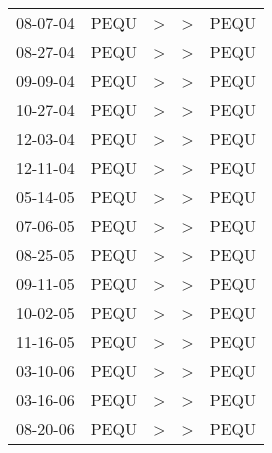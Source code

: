\begin{supertabular}{lllll}
 08-07-04 &  PEQU &  \textgreater &  \textgreater &  PEQU \\
 08-27-04 &  PEQU &  \textgreater &  \textgreater &  PEQU \\
 09-09-04 &  PEQU &  \textgreater &  \textgreater &  PEQU \\
 10-27-04 &  PEQU &  \textgreater &  \textgreater &  PEQU \\
 12-03-04 &  PEQU &  \textgreater &  \textgreater &  PEQU \\
 12-11-04 &  PEQU &  \textgreater &  \textgreater &  PEQU \\
 05-14-05 &  PEQU &  \textgreater &  \textgreater &  PEQU \\
 07-06-05 &  PEQU &  \textgreater &  \textgreater &  PEQU \\
 08-25-05 &  PEQU &  \textgreater &  \textgreater &  PEQU \\
 09-11-05 &  PEQU &  \textgreater &  \textgreater &  PEQU \\
 10-02-05 &  PEQU &  \textgreater &  \textgreater &  PEQU \\
 11-16-05 &  PEQU &  \textgreater &  \textgreater &  PEQU \\
 03-10-06 &  PEQU &  \textgreater &  \textgreater &  PEQU \\
 03-16-06 &  PEQU &  \textgreater &  \textgreater &  PEQU \\
 08-20-06 &  PEQU &  \textgreater &  \textgreater &  PEQU \\
\end{supertabular}

